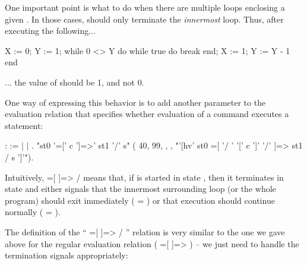 \documentclass[12pt]{report}
\begin{document}
    One important point is what to do when there are multiple loops
    enclosing a given . In those cases,  should only
    terminate the \textit{innermost} loop. Thus, after executing the
    following...


       X := 0;
       Y := 1;
       while 0 <> Y do
         while true do
           break
         end;
         X := 1;
         Y := Y - 1
       end


    ... the value of  should be 1, and not 0.


    One way of expressing this behavior is to add another parameter to
    the evaluation relation that specifies whether evaluation of a
    command executes a  statement: 
\begin{coqdoccode}
\coqdocemptyline
\coqdocnoindent
{}  :  :=\coqdoceol
\coqdocindent{1.00em}
\ensuremath{|} \coqdoceol
\coqdocindent{1.00em}
\ensuremath{|} .\coqdoceol
\coqdocemptyline
\coqdocnoindent
{}\coqdoceol
\coqdocindent{4.50em}
"st0 '=[' c ']=>' st1 '/' s"\coqdoceol
\coqdocindent{4.50em}
(  40,      99,\coqdoceol
\coqdocindent{5.00em}
 ,     ,\coqdoceol
\coqdocindent{5.00em}
 "'[hv' st0  =[ '/  ' '[' c ']' '/' ]=>  st1 / s ']'").\coqdoceol
\coqdocemptyline
\end{coqdoccode}
Intuitively,  =[  ]=>  /  means that, if  is started in
    state , then it terminates in state  and either signals
    that the innermost surrounding loop (or the whole program) should
    exit immediately ( = ) or that execution should continue
    normally ( = ).


    The definition of the `` =[  ]=>  / '' relation is very
    similar to the one we gave above for the regular evaluation
    relation ( =[  ]=> ) -- we just need to handle the
    termination signals appropriately:
\end{document}
